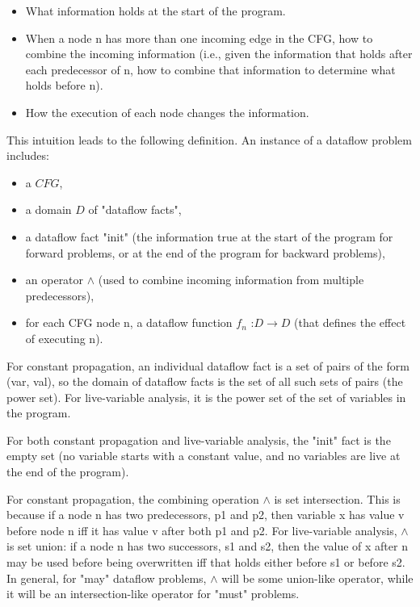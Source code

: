 \begin{itemize}
	\item What information holds at the start of the program.
	\item When a node n has more than one incoming edge in the CFG, how to combine the incoming
	      information (i.e., given the information that holds after each predecessor of n, how to
	      combine that information to determine what holds before n).
	\item How the execution of each node changes the information.
\end{itemize}

This intuition leads to the following definition. An instance of a dataflow problem includes:
\begin{itemize}
	\item a \(CFG\),
	\item a domain \(D\) of "dataflow facts",
	\item a dataflow fact "init" (the information true at the start of the program for forward problems,
	      or at the end of the program for backward problems),
	\item an operator \(\wedge\) (used to combine incoming information from multiple predecessors),
	\item for each CFG node n, a dataflow function \(f_n\) :\( D \rightarrow D\) (that defines the effect of
	      executing n).
\end{itemize}

For constant propagation, an individual dataflow fact is a set of pairs of the form (var, val),
so the domain of dataflow facts is the set of all such sets of pairs (the power set).
For live-variable analysis, it is the power set of the set of variables in the program.

For both constant propagation and live-variable analysis, the "init" fact is the empty set
(no variable starts with a constant value, and no variables are live at the end of the program).



For constant propagation, the combining operation \(\wedge\) is set intersection.
This is because if a node n has two predecessors, p1 and p2, then variable x has value v before
node n iff it has value v after both p1 and p2. For live-variable analysis,
\(\wedge\) is set union: if a node n has two successors, s1 and s2, then the value of x after n may be
used before being overwritten iff that holds either before s1 or before s2. In general,
for "may" dataflow problems, \(\wedge\) will be some union-like operator, while it will be an intersection-like
operator for "must" problems.


